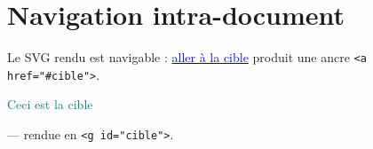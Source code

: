 \documentclass{article}
\begin{document}
\hsize=380pt
\section{Navigation intra-document}
Le SVG rendu est navigable : \hyperlink{cible}{\textcolor{blue}{aller \`a la cible}}
produit une ancre \texttt{<a href="\#cible">}.

\vspace{40pt}
\hypertarget{cible}{\textcolor{teal}{Ceci est la cible}} — rendue
en \texttt{<g id="cible">}.
\end{document}
